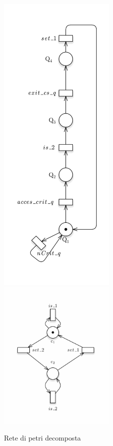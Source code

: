 \documentclass[a4paper]{article}
\begin{document}
\begin{figure}[!ht]
{\includegraphics[width=0.5\textwidth]{q3.2.png}
\includegraphics[width=0.5\textwidth]{variable3.2.png}}
\caption{Rete di petri decomposta} \label{FIG:decomposed3.2PN}
\end{figure}
\end{document}
